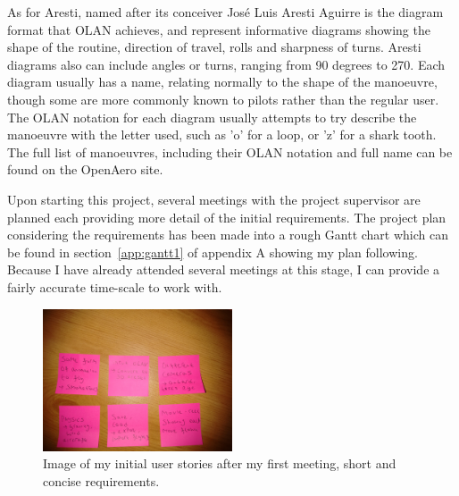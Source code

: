 As for Aresti, named after its conceiver José Luis Aresti Aguirre\cite{Aresti} is the diagram format that OLAN achieves, and represent informative diagrams showing the shape of the routine, direction of travel, rolls and sharpness of turns. Aresti diagrams also can include angles or turns, ranging from 90 degrees to 270. Each diagram usually has a name\cite{Aresti_Simple}, relating normally to the shape of the manoeuvre, though some are more commonly known to pilots rather than the regular user. The OLAN notation for each diagram usually attempts to try describe the manoeuvre with the letter used, such as 'o' for a loop, or 'z' for a shark tooth. The full list of manoeuvres, including their OLAN notation and full name can be found on the OpenAero\cite{OpenAero_Language} site.

Upon starting this project, several meetings with the project supervisor are planned each providing more detail of the initial requirements. The project plan considering the requirements has been made into a rough Gantt chart which can be found in section~\ref{app:gantt1} of appendix A showing my plan following. Because I have already attended several meetings at this stage, I can provide a fairly accurate time-scale to work with.\\

\begin{figure}[h!]
  \centering
      \includegraphics[width=0.5\textwidth]{images/notes.jpg}
  \caption{Image of my initial user stories after my first meeting, short and concise requirements.}
\end{figure}

